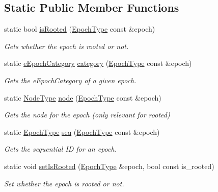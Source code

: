 \subsection*{Static Public Member Functions}
\begin{DoxyCompactItemize}
\item 
static bool \hyperlink{structvt_1_1epoch_1_1_epoch_manip_a00210a34334fb86984cfbd08bae74929}{is\+Rooted} (\hyperlink{namespacevt_a985a5adf291c34a3ca263b3378388236}{Epoch\+Type} const \&epoch)
\begin{DoxyCompactList}\small\item\em Gets whether the epoch is rooted or not. \end{DoxyCompactList}\item 
static \hyperlink{namespacevt_1_1epoch_a956abe0aceef0d10a988de8acb002c7c}{e\+Epoch\+Category} \hyperlink{structvt_1_1epoch_1_1_epoch_manip_aa61d47033545df147c01036211c4cabe}{category} (\hyperlink{namespacevt_a985a5adf291c34a3ca263b3378388236}{Epoch\+Type} const \&epoch)
\begin{DoxyCompactList}\small\item\em Gets the {\ttfamily e\+Epoch\+Category} of a given epoch. \end{DoxyCompactList}\item 
static \hyperlink{namespacevt_a866da9d0efc19c0a1ce79e9e492f47e2}{Node\+Type} \hyperlink{structvt_1_1epoch_1_1_epoch_manip_a7120f73ef583ab8f061334fc0bc519c3}{node} (\hyperlink{namespacevt_a985a5adf291c34a3ca263b3378388236}{Epoch\+Type} const \&epoch)
\begin{DoxyCompactList}\small\item\em Gets the node for the epoch (only relevant for rooted) \end{DoxyCompactList}\item 
static \hyperlink{namespacevt_a985a5adf291c34a3ca263b3378388236}{Epoch\+Type} \hyperlink{structvt_1_1epoch_1_1_epoch_manip_ac34685702f19dde2f5bc25fcb43ec038}{seq} (\hyperlink{namespacevt_a985a5adf291c34a3ca263b3378388236}{Epoch\+Type} const \&epoch)
\begin{DoxyCompactList}\small\item\em Gets the sequential ID for an epoch. \end{DoxyCompactList}\item 
static void \hyperlink{structvt_1_1epoch_1_1_epoch_manip_aae48ba1aafb105551df363ffcb578881}{set\+Is\+Rooted} (\hyperlink{namespacevt_a985a5adf291c34a3ca263b3378388236}{Epoch\+Type} \&epoch, bool const is\+\_\+rooted)
\begin{DoxyCompactList}\small\item\em Set whether the {\ttfamily epoch} is rooted or not. \end{DoxyCompactList}\item 

\end{DoxyCompactItemize}
